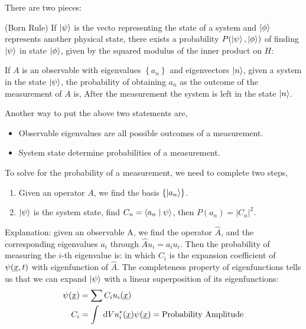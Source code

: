\documentclass{school-22.101-notes}
\date{September 14, 2011}
\begin{document}
\maketitle


\begin{axiom}
There are two pieces:
\begin{subaxiom}
  (Born Rule) If $\left| \psi \right>$ is the vecto representing the state of a system and $\left| \phi \right>$ represents another physical state, there exists a probability $P(\left| \psi \right>, \left| \phi \right>)$ of finding $\left| \psi \right>$ in state $\left| \phi \right>$, given by the squared modulus of the inner product on $H$:
\end{subaxiom}
\begin{subaxiom}
  If $A$ is an observable with eigenvalues $\left\{ a_n \right\}$ and eigenvectors $\left| n \right>$, given a system in the state $\left| \psi \right>$, the probability of obtaining $a_n$ as the outcome of the measurement of $A$ is, 
  After the measurement the system is left in the state $\left| n \right>$.
\end{subaxiom}
\end{axiom}

Another way to put the above two  statements are, 
\begin{itemize}
\item Observable eigenvalues are all possible outcomes of a measurement. 
\item System state determine probabilities of a measurement. 
\end{itemize}

To solve for the probability of a measurement, we need to complete two steps, 
\begin{enumerate}
\item Given an operator $A$, we find the basis $\left\{ \left| a_n \right> \right\}$. 
\item $\left| \psi \right>$ is the system state, find $C_n = \langle a_n \mid \psi \rangle$, then $P(a_n) = |C_n|^2$. 
\end{enumerate}
Explanation: given an observable A, we find the operator $\hat{A}$, and the corresponding eigenvalues $a_i$ through $\hat{A} u_i = a_i u_i$. Then the probability of measuring the $i$-th eigenvalue is:
in which $C_i$ is the expansion coefficient of $\psi(\underline{x}, t)$ with eigenfunction of $\hat{A}$. The completeness property of eigenfunctions tells us that we can expand $\left| \psi \right>$ with a linear superposition of its eigenfunctions:
\begin{align}
\psi(\underline{x}) &= \displaystyle\sum C_i u_i (\underline{x}) \\
C_i &= \int \mbox{ }\mathrm{d} V u_i^* (\underline{x}) \psi(\underline{x}) = \mbox{Probability Amplitude}
\end{align}
\end{document}
